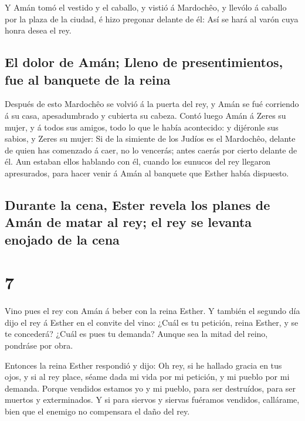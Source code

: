  Y Amán tomó el vestido y el caballo, y vistió á
Mardochêo, y llevólo á caballo por la plaza de la ciudad, é hizo
pregonar delante de él: Así se hará al varón cuya honra desea el rey.

\hypertarget{el-dolor-de-amuxe1n-lleno-de-presentimientos-fue-al-banquete-de-la-reina}{%
\subsection{El dolor de Amán; Lleno de presentimientos, fue al banquete
de la
reina}\label{el-dolor-de-amuxe1n-lleno-de-presentimientos-fue-al-banquete-de-la-reina}}

 Después de esto Mardochêo se volvió á la puerta del rey,
y Amán se fué corriendo á su casa, apesadumbrado y cubierta su cabeza.
 Contó luego Amán á Zeres su mujer, y á todos sus amigos,
todo lo que le había acontecido: y dijéronle sus sabios, y Zeres su
mujer: Si de la simiente de los Judíos es el Mardochêo, delante de quien
has comenzado á caer, no lo vencerás; antes caerás por cierto delante de
él.  Aun estaban ellos hablando con él, cuando los
eunucos del rey llegaron apresurados, para hacer venir á Amán al
banquete que Esther había dispuesto.

\hypertarget{durante-la-cena-ester-revela-los-planes-de-amuxe1n-de-matar-al-rey-el-rey-se-levanta-enojado-de-la-cena}{%
\subsection{Durante la cena, Ester revela los planes de Amán de matar al
rey; el rey se levanta enojado de la
cena}\label{durante-la-cena-ester-revela-los-planes-de-amuxe1n-de-matar-al-rey-el-rey-se-levanta-enojado-de-la-cena}}

\hypertarget{section-6}{%
\section{7}\label{section-6}}

 Vino pues el rey con Amán á beber con la reina Esther.
 Y también el segundo día dijo el rey á Esther en el
convite del vino: ¿Cuál es tu petición, reina Esther, y se te concederá?
¿Cuál es pues tu demanda? Aunque sea la mitad del reino, pondráse por
obra.

 Entonces la reina Esther respondió y dijo: Oh rey, si he
hallado gracia en tus ojos, y si al rey place, séame dada mi vida por mi
petición, y mi pueblo por mi demanda.  Porque vendidos
estamos yo y mi pueblo, para ser destruídos, para ser muertos y
exterminados. Y si para siervos y siervas fuéramos vendidos, callárame,
bien que el enemigo no compensara el daño del rey.

